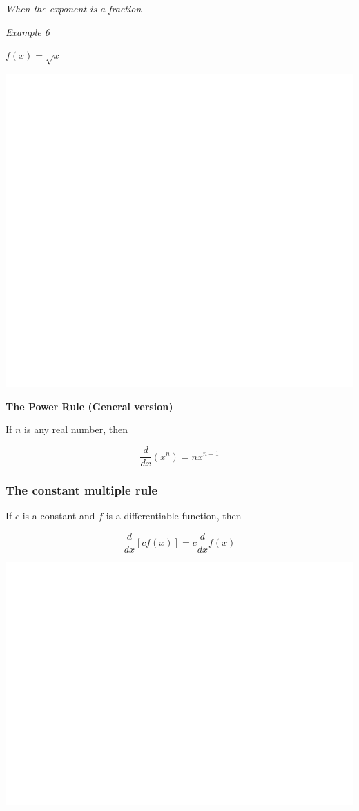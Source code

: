 \documentclass[]{book}
\begin{document}
\emph{When the exponent is a fraction}

\emph{Example 6}

\(f(x)=\sqrt{x}\)

\begin{center}\includegraphics[width=1\linewidth]{figure/LB9-1} \end{center}

\textbf{The Power Rule (General version)}

If \(n\) is any real number, then

\[\frac{d}{dx}(x^n)=nx^{n-1}\]

\hypertarget{the-constant-multiple-rule}{%
\subsubsection{The constant multiple rule}\label{the-constant-multiple-rule}}

If \(c\) is a constant and \(f\) is a differentiable function, then

\[\frac{d}{dx}[cf(x)]= c\frac{d}{dx}f(x)\]

\newpage

\begin{center}\includegraphics[width=1\linewidth]{figure/LB10-1} \end{center}
\end{document}
